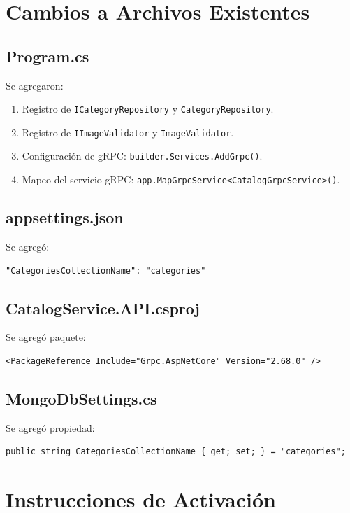 \documentclass[12pt,a4paper]{article}
\begin{document}
\section{Cambios a Archivos Existentes}

\subsection{Program.cs}

Se agregaron:
\begin{enumerate}[leftmargin=1.5em]
  \item Registro de \texttt{ICategoryRepository} y \texttt{CategoryRepository}.
  \item Registro de \texttt{IImageValidator} y \texttt{ImageValidator}.
  \item Configuraci\'on de gRPC: \texttt{builder.Services.AddGrpc()}.
  \item Mapeo del servicio gRPC: \texttt{app.MapGrpcService\textless CatalogGrpcService\textgreater()}.
\end{enumerate}

\subsection{appsettings.json}

Se agreg\'o:
\begin{verbatim}
"CategoriesCollectionName": "categories"
\end{verbatim}

\subsection{CatalogService.API.csproj}

Se agreg\'o paquete:
\begin{verbatim}
<PackageReference Include="Grpc.AspNetCore" Version="2.68.0" />
\end{verbatim}

\subsection{MongoDbSettings.cs}

Se agreg\'o propiedad:
\begin{verbatim}
public string CategoriesCollectionName { get; set; } = "categories";
\end{verbatim}

\section{Instrucciones de Activaci\'on}
\end{document}
